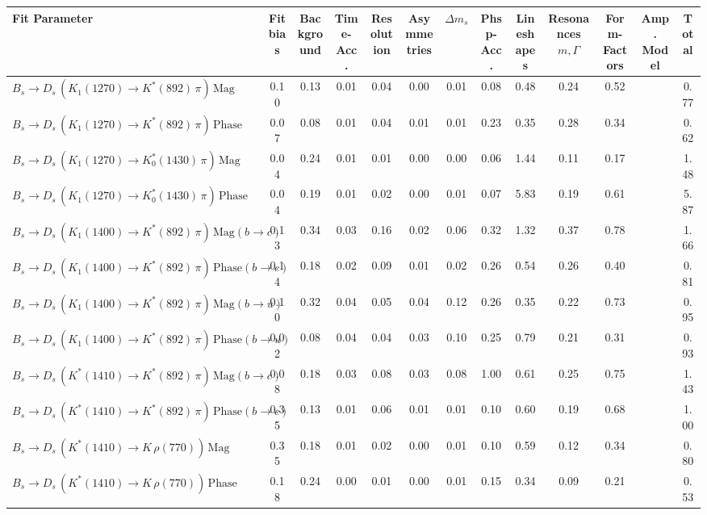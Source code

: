 \begin{tabular}{l  c  c  c  c  c  c  c  c  c  c  c  | c }
\hline
\hline
Fit Parameter & Fit bias & Background & Time-Acc. & Resolution & Asymmetries & $\Delta m_{s}$ & Phsp-Acc. & Lineshapes & Resonances $m,\Gamma$ & Form-Factors & Amp. Model &  Total  \\ 
\hline
$B_s \to D_s \, ( K_1(1270) \to K^{*}(892) \, \pi ) \, \text{Mag}$ & 0.10 & 0.13 & 0.01 & 0.04 & 0.00 & 0.01 & 0.08 & 0.48 & 0.24 & 0.52 &  & 0.77 \\ 
$B_s \to D_s \, ( K_1(1270) \to K^{*}(892) \, \pi ) \, \text{Phase}$ & 0.07 & 0.08 & 0.01 & 0.04 & 0.01 & 0.01 & 0.23 & 0.35 & 0.28 & 0.34 &  & 0.62 \\ 
$B_s \to D_s \, ( K_1(1270) \to K^{*}_{0}(1430) \, \pi ) \, \text{Mag} $ & 0.04 & 0.24 & 0.01 & 0.01 & 0.00 & 0.00 & 0.06 & 1.44 & 0.11 & 0.17 &  & 1.48 \\ 
$B_s \to D_s \, ( K_1(1270) \to K^{*}_{0}(1430) \, \pi ) \, \text{Phase} $ & 0.04 & 0.19 & 0.01 & 0.02 & 0.00 & 0.01 & 0.07 & 5.83 & 0.19 & 0.61 &  & 5.87 \\ 
$B_s \to D_s \, ( K_1(1400) \to K^{*}(892) \, \pi ) \, \text{Mag} (b \to c)$ & 0.13 & 0.34 & 0.03 & 0.16 & 0.02 & 0.06 & 0.32 & 1.32 & 0.37 & 0.78 &  & 1.66 \\ 
$B_s \to D_s \, ( K_1(1400) \to K^{*}(892) \, \pi ) \, \text{Phase} (b \to c)$ & 0.14 & 0.18 & 0.02 & 0.09 & 0.01 & 0.02 & 0.26 & 0.54 & 0.26 & 0.40 &  & 0.81 \\ 
$B_s \to D_s \, ( K_1(1400) \to K^{*}(892) \, \pi ) \, \text{Mag} (b \to u)$ & 0.10 & 0.32 & 0.04 & 0.05 & 0.04 & 0.12 & 0.26 & 0.35 & 0.22 & 0.73 &  & 0.95 \\ 
$B_s \to D_s \, ( K_1(1400) \to K^{*}(892) \, \pi ) \, \text{Phase} (b \to u)$ & 0.02 & 0.08 & 0.04 & 0.04 & 0.03 & 0.10 & 0.25 & 0.79 & 0.21 & 0.31 &  & 0.93 \\ 
$B_s \to D_s \, ( K^{*}(1410) \to K^{*}(892) \, \pi ) \, \text{Mag} (b \to c)$ & 0.08 & 0.18 & 0.03 & 0.08 & 0.03 & 0.08 & 1.00 & 0.61 & 0.25 & 0.75 &  & 1.43 \\ 
$B_s \to D_s \, ( K^{*}(1410) \to K^{*}(892) \, \pi ) \, \text{Phase} (b \to c)$ & 0.35 & 0.13 & 0.01 & 0.06 & 0.01 & 0.01 & 0.10 & 0.60 & 0.19 & 0.68 &  & 1.00 \\ 
$B_s \to D_s \, ( K^{*}(1410) \to K \, \rho(770) ) \, \text{Mag}$ & 0.35 & 0.18 & 0.01 & 0.02 & 0.00 & 0.01 & 0.10 & 0.59 & 0.12 & 0.34 &  & 0.80 \\ 
$B_s \to D_s \, ( K^{*}(1410) \to K \, \rho(770) ) \, \text{Phase}$ & 0.18 & 0.24 & 0.00 & 0.01 & 0.00 & 0.01 & 0.15 & 0.34 & 0.09 & 0.21 &  & 0.53 \\ 

\end{tabular}
